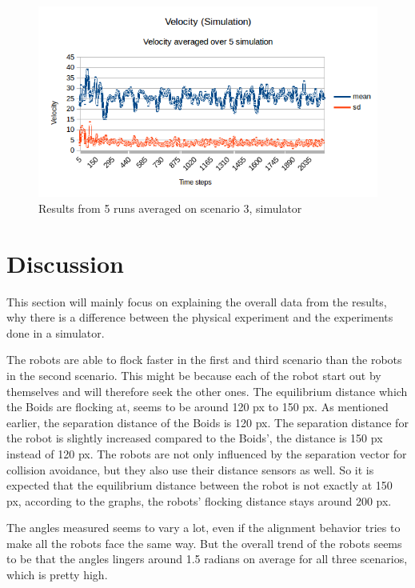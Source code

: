\begin{figure}[h]
\begin{center}
\includegraphics[width=0.8\linewidth]{figs/runs/3svel}
\end{center}
\caption[3. Velocity, robots]{Results from 5 runs averaged on scenario 3, simulator}
\label{fig:res3svel}
\end{figure}

\clearpage
\section{Discussion}
\label{sec:discussion}
This section will mainly focus on explaining the overall data from the results, why there is a difference between the physical experiment and the experiments done in a simulator.

The robots are able to flock faster in the first and third scenario than the robots in the second scenario. This might be because each of the robot start out by themselves and will therefore seek the other ones.
The equilibrium distance which the Boids are flocking at, seems to be around 120 px to 150 px. As mentioned earlier, the separation distance of the Boids is 120 px.
The separation distance for the robot is slightly increased compared to the Boids', the distance is 150 px instead of 120 px. The robots are not only influenced by the separation vector for collision avoidance, but they also use their distance sensors as well. So it is expected that the equilibrium distance between the robot is not exactly at 150 px, according to the graphs, the robots' flocking distance stays around 200 px.

The angles measured seems to vary a lot, even if the alignment behavior tries to make all the robots face the same way. But the overall trend of the robots seems to be that the angles lingers around 1.5 radians on average for all three scenarios, which is pretty high.

